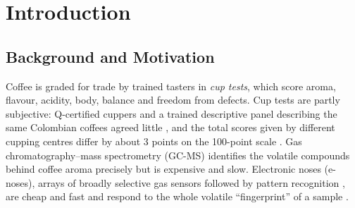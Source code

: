 \newpage
\thispagestyle{empty}
\clearpage             %
\thispagestyle{empty}  %
\phantom{a}            %
\newpage

\setlength{\floatsep}{8pt plus 2pt minus 2pt}
\setlength{\textfloatsep}{10pt plus 2pt minus 4pt}
\setlength{\intextsep}{8pt plus 2pt minus 2pt}
\setlength{\abovecaptionskip}{4pt}
\setlength{\belowcaptionskip}{4pt}
\setlength{\bibsep}{2pt plus 1pt}
\renewcommand{\topfraction}{0.9}
\renewcommand{\bottomfraction}{0.8}
\renewcommand{\textfraction}{0.07}
\renewcommand{\floatpagefraction}{0.75}
\setcounter{topnumber}{3}
\setcounter{bottomnumber}{2}
\setcounter{totalnumber}{5}

\section{Introduction}

\subsection{Background and Motivation}

Coffee is graded for trade by trained tasters in \emph{cup tests}, which score aroma, flavour, acidity, body, balance and freedom from defects. Cup tests are partly subjective: Q-certified cuppers and a trained descriptive panel describing the same Colombian coffees agreed little \cite{didonfrancesco2014comparison}, and the total scores given by different cupping centres differ by about 3 points on the 100-point scale \cite{worku2016reproducibility}. Gas chromatography--mass spectrometry (GC-MS) identifies the volatile compounds behind coffee aroma precisely \cite{huang2007fingerprint} but is expensive and slow. Electronic noses (e-noses), arrays of broadly selective gas sensors followed by pattern recognition \cite{persaud1982analysis,gardner1999electronic}, are cheap and fast and respond to the whole volatile ``fingerprint'' of a sample \cite{wilson2009applications}.

